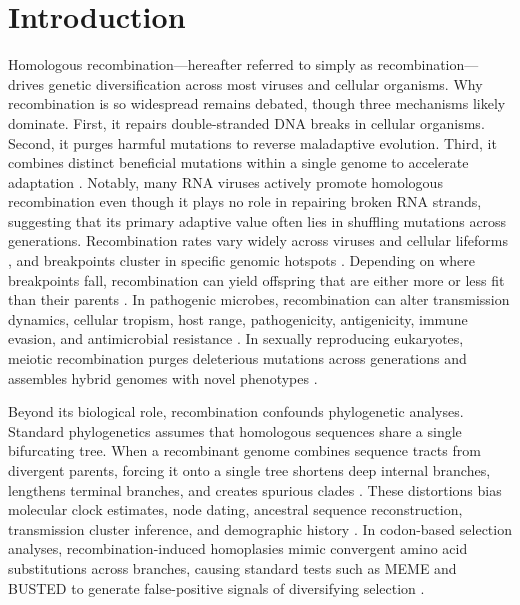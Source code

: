 \section{Introduction}
\label{sec:introduction}

Homologous recombination—hereafter referred to simply as recombination—drives genetic diversification across most viruses and cellular organisms. Why recombination is so widespread remains debated, though three mechanisms likely dominate. First, it repairs double-stranded DNA breaks in cellular organisms. Second, it purges harmful mutations to reverse maladaptive evolution. Third, it combines distinct beneficial mutations within a single genome to accelerate adaptation \citep{simonloriere2011recombination,didelot2010impact}. Notably, many RNA viruses actively promote homologous recombination even though it plays no role in repairing broken RNA strands, suggesting that its primary adaptive value often lies in shuffling mutations across generations. Recombination rates vary widely across viruses \citep{simonloriere2011recombination} and cellular lifeforms \citep{didelot2010impact,mcvean2004fine}, and breakpoints cluster in specific genomic hotspots \citep{mcvean2004fine,lytras2022exploring}. Depending on where breakpoints fall, recombination can yield offspring that are either more or less fit than their parents \citep{simonloriere2011recombination,lytras2022exploring}. In pathogenic microbes, recombination can alter transmission dynamics, cellular tropism, host range, pathogenicity, antigenicity, immune evasion, and antimicrobial resistance \citep{alfonsi2024data,didelot2010impact,croucher2011rapid}. In sexually reproducing eukaryotes, meiotic recombination purges deleterious mutations across generations and assembles hybrid genomes with novel phenotypes \citep{rieseberg2003major,mcvean2004fine}.

Beyond its biological role, recombination confounds phylogenetic analyses. Standard phylogenetics assumes that homologous sequences share a single bifurcating tree. When a recombinant genome combines sequence tracts from divergent parents, forcing it onto a single tree shortens deep internal branches, lengthens terminal branches, and creates spurious clades \citep{schierup2000consequences,kosakovsky2006gard}. These distortions bias molecular clock estimates, node dating, ancestral sequence reconstruction, transmission cluster inference, and demographic history \citep{schierup2000consequences,posada2002evaluation}. In codon-based selection analyses, recombination-induced homoplasies mimic convergent amino acid substitutions across branches, causing standard tests such as MEME and BUSTED \citep{murrell2012detecting,murrell2015gene} to generate false-positive signals of diversifying selection \citep{kosakovsky2006gard}.

